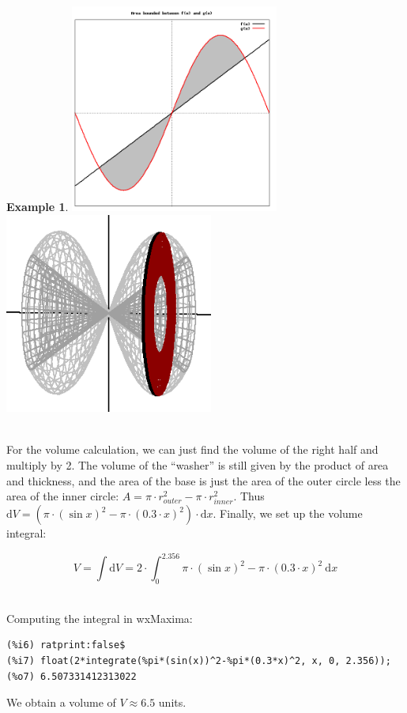 \documentclass[10.5pt,twoside]{report}
\theoremstyle{definition}
\newtheorem{exmp}{Example}[section]
\begin{document}
\begin{exmp}
\includegraphics[width=2.7in]{example_3_2_3_1}
\includegraphics[width=2.7in]{example_3_2_3_2}

${}$\\

For the volume calculation, we can just find the volume of the right half and multiply by 2.  The volume of the ``washer'' is still given by the product of area and thickness, and the area of the base is just the area of the outer circle less the area of the inner circle:  $A=\pi\cdot r_{outer}^2-\pi\cdot r_{inner}^2$. Thus $\mathrm{d}V =\left( \pi\cdot (\sin{x})^2 - \pi\cdot (0.3\cdot x)^2 \right)\cdot \mathrm{d}x$. Finally, we set up the volume integral:

\[V=\int \mathrm{d}V = 2\cdot \int_0^{2.356} \pi\cdot (\sin{x})^2 - \pi\cdot (0.3\cdot x)^2 \ \mathrm{d}x\]

${}$\\
Computing the integral in wxMaxima:

\begin{verbatim}
(%i6) ratprint:false$
(%i7) float(2*integrate(%pi*(sin(x))^2-%pi*(0.3*x)^2, x, 0, 2.356));
(%o7) 6.507331412313022
\end{verbatim}

We obtain a volume of $V\approx 6.5$ units.


\end{exmp}
\end{document}
